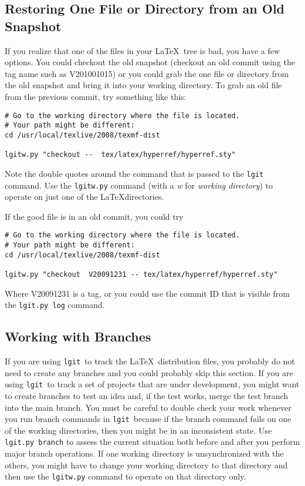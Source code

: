 \documentclass{ltxdoc}
\def\ucmd#1{{\tt {#1}}}
\def\lgit{{\tt lgit}}
\begin{document}
\subsection{Restoring One File or Directory from an Old Snapshot}
If you realize that one of the files in your \LaTeX\ tree is bad, you have a few options.  You could checkout the old snapshot (checkout an old commit using the tag name such as V201001015) or you could grab the one file or directory from the old snapshot and bring it into your working directory.  To grab an old file from the previous commit, try something like this:
\begin{verbatim}
# Go to the working directory where the file is located.
# Your path might be different:
cd /usr/local/texlive/2008/texmf-dist

lgitw.py "checkout --  tex/latex/hyperref/hyperref.sty"
\end{verbatim}
Note the double quotes around the command that is passed to the \ucmd{lgit} command.  Use the \ucmd{lgitw.py} command (with a \emph{w} for \emph{working   directory}) to operate on just one of the \LaTeX directories.

If the good file is in an old commit, you could try
\begin{verbatim}
# Go to the working directory where the file is located.
# Your path might be different:
cd /usr/local/texlive/2008/texmf-dist

lgitw.py "checkout  V20091231 -- tex/latex/hyperref/hyperref.sty"
\end{verbatim}
Where V20091231 is a tag, or you could use the commit ID that is visible from the \ucmd{lgit.py log} command.
\subsection{Working with Branches}
If you are using \lgit\ to track the \LaTeX\ distribution files, you probably do not need to create any branches and you could probably skip this section.  If you are using \lgit\ to track a set of projects that are under development, you might want to create branches to test an idea and, if the test works, merge the test branch into the main branch. You must be careful to double check your work whenever you run branch commands in \lgit\ because if the branch command fails on one of the working directories, then you might be in an inconsistent state.  Use \ucmd{lgit.py branch} to assess the current situation both before and after you perform major branch operations.  If one working directory is unsynchronized with the others, you might have to change your working directory to that directory and then use the \ucmd{lgitw.py} command to operate on that directory only.
\end{document}
